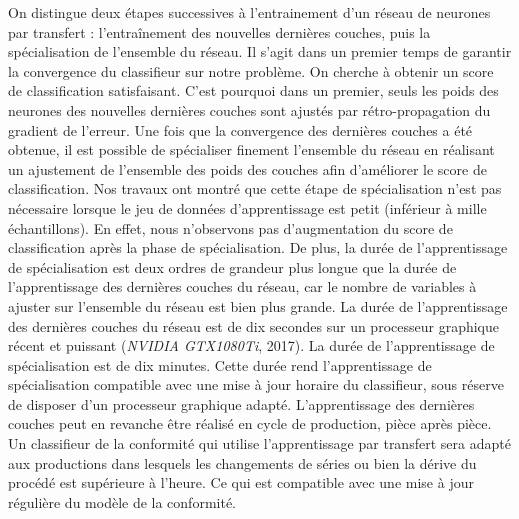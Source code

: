On distingue deux étapes successives à l'entrainement d'un réseau de neurones par transfert : l'entraînement des nouvelles dernières couches, puis la spécialisation de l'ensemble du réseau.
Il s'agit dans un premier temps de garantir la convergence du classifieur sur notre problème.
On cherche à obtenir un score de classification satisfaisant.
C'est pourquoi dans un premier, seuls les poids des neurones des nouvelles dernières couches sont ajustés par rétro-propagation du gradient de l'erreur.
Une fois que la convergence des dernières couches a été obtenue, il est possible de spécialiser finement l'ensemble du réseau en réalisant un ajustement de l'ensemble des poids des couches afin d'améliorer le score de classification.
Nos travaux ont montré que cette étape de spécialisation n'est pas nécessaire lorsque le jeu de données d'apprentissage est petit (inférieur à mille échantillons).
En effet, nous n'observons pas d'augmentation du score de classification après la phase de spécialisation.
De plus, la durée de l'apprentissage de spécialisation est deux ordres de grandeur plus longue que la durée de l'apprentissage des dernières couches du réseau, car le nombre de variables à ajuster sur l'ensemble du réseau est bien plus grande.
La durée de l'apprentissage des dernières couches du réseau est de dix secondes sur un processeur graphique récent et puissant (\textit{NVIDIA GTX1080Ti}, 2017).
La durée de l'apprentissage de spécialisation est de dix minutes.
Cette durée rend l'apprentissage de spécialisation compatible avec une mise à jour horaire du classifieur, sous réserve de disposer d'un processeur graphique adapté. L'apprentissage des dernières couches peut en revanche être réalisé en cycle de production, pièce après pièce.
Un classifieur de la conformité qui utilise l'apprentissage par transfert sera adapté aux productions dans lesquels les changements de séries ou bien la dérive du procédé est supérieure à l'heure. Ce qui est compatible avec une mise à jour régulière du modèle de la conformité.